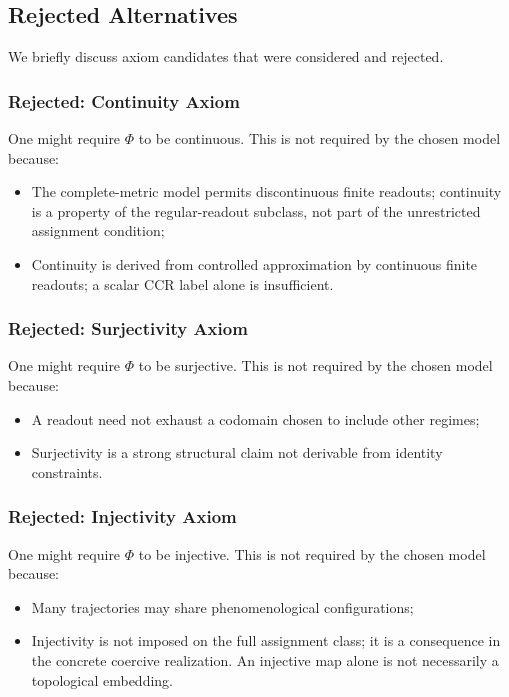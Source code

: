 \subsection{Rejected Alternatives}

We briefly discuss axiom candidates that were considered and rejected.

\subsubsection{Rejected: Continuity Axiom}
One might require $\Phi$ to be continuous. This is not required by the chosen model because:
\begin{itemize}[leftmargin=*]
    \item The complete-metric model permits discontinuous finite readouts; continuity is a property of the regular-readout subclass, not part of the unrestricted assignment condition;
    \item Continuity is derived from controlled approximation by continuous finite readouts; a scalar CCR label alone is insufficient.
\end{itemize}

\subsubsection{Rejected: Surjectivity Axiom}
One might require $\Phi$ to be surjective. This is not required by the chosen model because:
\begin{itemize}[leftmargin=*]
    \item A readout need not exhaust a codomain chosen to include other regimes;
    \item Surjectivity is a strong structural claim not derivable from identity constraints.
\end{itemize}

\subsubsection{Rejected: Injectivity Axiom}
One might require $\Phi$ to be injective. This is not required by the chosen model because:
\begin{itemize}[leftmargin=*]
    \item Many trajectories may share phenomenological configurations;
    \item Injectivity is not imposed on the full assignment class; it is a consequence in the concrete coercive realization. An injective map alone is not necessarily a topological embedding.
\end{itemize}

